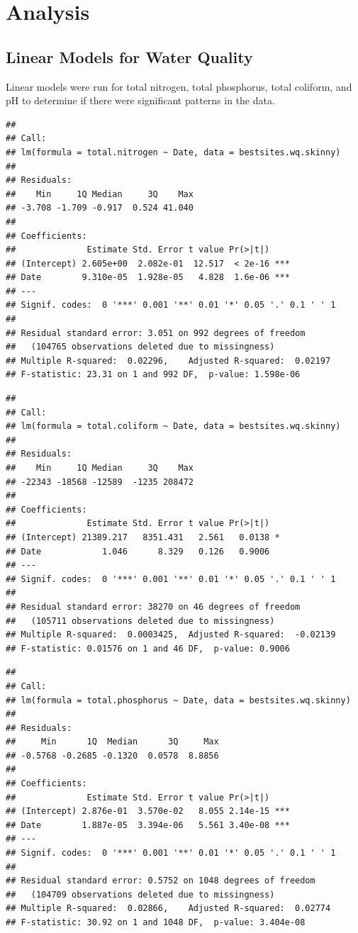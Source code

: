 \documentclass[12pt,]{article}
\begin{document}
\newpage

\hypertarget{analysis}{%
\section{Analysis}\label{analysis}}

\hypertarget{linear-models-for-water-quality}{%
\subsection{Linear Models for Water
Quality}\label{linear-models-for-water-quality}}

Linear models were run for total nitrogen, total phosphorus, total
coliform, and pH to determine if there were significant patterns in the
data.

\begin{verbatim}
## 
## Call:
## lm(formula = total.nitrogen ~ Date, data = bestsites.wq.skinny)
## 
## Residuals:
##    Min     1Q Median     3Q    Max 
## -3.708 -1.709 -0.917  0.524 41.040 
## 
## Coefficients:
##              Estimate Std. Error t value Pr(>|t|)    
## (Intercept) 2.605e+00  2.082e-01  12.517  < 2e-16 ***
## Date        9.310e-05  1.928e-05   4.828  1.6e-06 ***
## ---
## Signif. codes:  0 '***' 0.001 '**' 0.01 '*' 0.05 '.' 0.1 ' ' 1
## 
## Residual standard error: 3.051 on 992 degrees of freedom
##   (104765 observations deleted due to missingness)
## Multiple R-squared:  0.02296,    Adjusted R-squared:  0.02197 
## F-statistic: 23.31 on 1 and 992 DF,  p-value: 1.598e-06
\end{verbatim}

\begin{verbatim}
## 
## Call:
## lm(formula = total.coliform ~ Date, data = bestsites.wq.skinny)
## 
## Residuals:
##    Min     1Q Median     3Q    Max 
## -22343 -18568 -12589  -1235 208472 
## 
## Coefficients:
##              Estimate Std. Error t value Pr(>|t|)  
## (Intercept) 21389.217   8351.431   2.561   0.0138 *
## Date            1.046      8.329   0.126   0.9006  
## ---
## Signif. codes:  0 '***' 0.001 '**' 0.01 '*' 0.05 '.' 0.1 ' ' 1
## 
## Residual standard error: 38270 on 46 degrees of freedom
##   (105711 observations deleted due to missingness)
## Multiple R-squared:  0.0003425,  Adjusted R-squared:  -0.02139 
## F-statistic: 0.01576 on 1 and 46 DF,  p-value: 0.9006
\end{verbatim}

\begin{verbatim}
## 
## Call:
## lm(formula = total.phosphorus ~ Date, data = bestsites.wq.skinny)
## 
## Residuals:
##     Min      1Q  Median      3Q     Max 
## -0.5768 -0.2685 -0.1320  0.0578  8.8856 
## 
## Coefficients:
##              Estimate Std. Error t value Pr(>|t|)    
## (Intercept) 2.876e-01  3.570e-02   8.055 2.14e-15 ***
## Date        1.887e-05  3.394e-06   5.561 3.40e-08 ***
## ---
## Signif. codes:  0 '***' 0.001 '**' 0.01 '*' 0.05 '.' 0.1 ' ' 1
## 
## Residual standard error: 0.5752 on 1048 degrees of freedom
##   (104709 observations deleted due to missingness)
## Multiple R-squared:  0.02866,    Adjusted R-squared:  0.02774 
## F-statistic: 30.92 on 1 and 1048 DF,  p-value: 3.404e-08
\end{verbatim}
\end{document}
